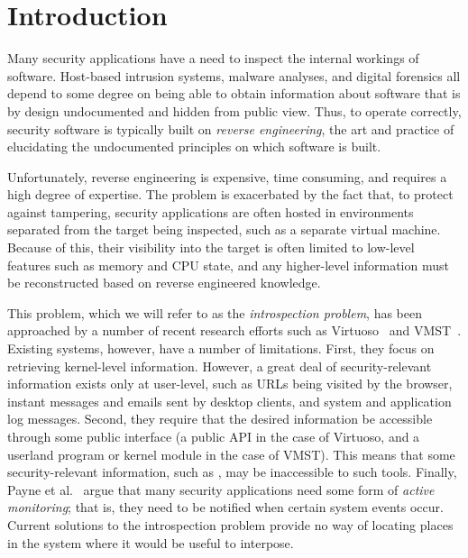 \section{Introduction}
\label{sec:introduction}

Many security applications have a need to inspect the internal workings
of software. Host-based intrusion systems, malware analyses, and
digital forensics all depend to some degree on being able to obtain
information about software that is by design undocumented and hidden
from public view. Thus, to operate correctly, security software is
typically built on \emph{reverse engineering}, the art and practice of
elucidating the undocumented principles on which software is built.

Unfortunately, reverse engineering is expensive, time consuming, and
requires a high degree of expertise. The problem is exacerbated by the
fact that, to protect against tampering, security applications are often
hosted in environments separated from the target being inspected, such
as a separate virtual machine. Because of this, their visibility into
the target is often limited to low-level features such as memory and CPU
state, and any higher-level information must be reconstructed based on
reverse engineered knowledge.

This problem, which we will refer to as the \emph{introspection
problem}, has been approached by a number of recent research efforts
such as Virtuoso~\cite{Dolan-Gavitt:2011uq} and VMST~\cite{Fu:2012fk}.
Existing systems, however, have a number of limitations. First, they
focus on retrieving kernel-level information. However, a great deal of
security-relevant information exists only at user-level, such as URLs
being visited by the browser, instant messages and emails sent by
desktop clients, and system and application log messages. Second,
they require that the desired information be accessible through some
public interface (a public API in the case of Virtuoso, and a userland
program or kernel module in the case of VMST). This means that some
security-relevant information, such as , may be
inaccessible to such tools. Finally, Payne et al.~\cite{payne:2008}
argue that many security applications need some form of \emph{active
monitoring}; that is, they need to be notified when certain system
events occur. Current solutions to the introspection problem provide no
way of locating places in the system where it would be useful to
interpose.

